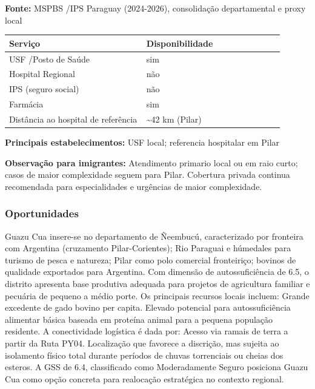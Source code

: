 \textbf{Fonte:} MSPBS /\allowbreak  IPS Paraguay (2024-2026), consolidação
departamental e proxy local

{\def\LTcaptype{none} %
\begin{longtable}{@{}>{\raggedright\arraybackslash}p{0.45\linewidth} >{\raggedright\arraybackslash}p{0.45\linewidth}@{}}
\toprule\noalign{}
Serviço & Disponibilidade \\
\midrule\noalign{}
\endhead
\bottomrule\noalign{}
\endlastfoot
USF /\allowbreak  Posto de Saúde & sim \\
Hospital Regional & não \\
IPS (seguro social) & não \\
Farmácia & sim \\
Distância ao hospital de referência & \textasciitilde42 km (Pilar) \\
\end{longtable}
}

\textbf{Principais estabelecimentos:} USF local; referencia hospitalar
em Pilar

\textbf{Observação para imigrantes:} Atendimento primario local ou em
raio curto; casos de maior complexidade seguem para Pilar. Cobertura
privada continua recomendada para especialidades e urgências de maior
complexidade.
\newpage

\subsubsection*{Oportunidades}\label{oport-guazu-cua-1206}
Guazu Cua insere-se no departamento de Ñeembucú, caracterizado por fronteira com Argentina (cruzamento Pilar-Corientes); Rio Paraguai e húmedales para turismo de pesca e natureza; Pilar como polo comercial fronteiriço; bovinos de qualidade exportados para Argentina. Com dimensão de autossuficiência de 6.5, o distrito apresenta base produtiva adequada para projetos de agricultura familiar e pecuária de pequeno a médio porte. Os principais recursos locais incluem: Grande excedente de gado bovino per capita. Elevado potencial para autossuficiência alimentar básica baseada em proteína animal para a pequena população residente. A conectividade logística é dada por: Acesso via ramais de terra a partir da Ruta PY04. Localização que favorece a discrição, mas sujeita ao isolamento físico total durante períodos de chuvas torrenciais ou cheias dos esteros. A GSS de 6.4, classificado como Moderadamente Seguro posiciona Guazu Cua como opção concreta para realocação estratégica no contexto regional.

